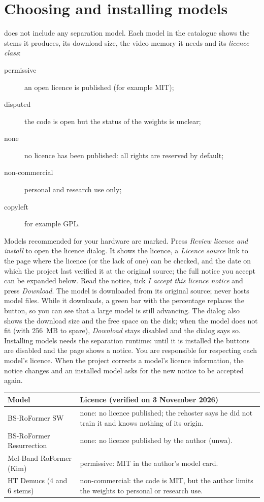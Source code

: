 \documentclass{covermaker}
\begin{document}
\chapter{Choosing and installing models}\label{ch:models}
\CM{} does not include any separation model. Each model in the catalogue shows
the stems it produces, its download size, the video memory it needs and its
\emph{licence class}:
\begin{description}
  \item[permissive] an open licence is published (for example MIT);
  \item[disputed] the code is open but the status of the weights is unclear;
  \item[none] no licence has been published: all rights are reserved by default;
  \item[non-commercial] personal and research use only;
  \item[copyleft] for example GPL.
\end{description}
Models recommended for your hardware are marked. Press \emph{Review licence and
install} to open the licence dialog. It shows the licence, a \emph{Licence
source} link to the page where the licence (or the lack of one) can be checked,
and the date on which the project last verified it at the original source;
the full notice you accept can be expanded below. Read the notice, tick \emph{I accept this licence notice} and press
\emph{Download}. The model is downloaded from its original source; \CM{} never
hosts model files. While it downloads, a green bar with the percentage replaces
the button, so you can see that a large model is still advancing. The dialog
also shows the download size and the free space on the disk; when the model
does not fit (with 256~MB to spare), \emph{Download} stays disabled and the
dialog says so. Installing
models needs the separation runtime: until it is installed the buttons are
disabled and the page shows a notice. You are responsible for respecting each model's licence.
When the project corrects a model's licence information, the notice changes and
an installed model asks for the new notice to be accepted again.

\begin{tabularx}{\linewidth}{@{}lY@{}}
\toprule
\textbf{Model} & \textbf{Licence (verified on 3 November 2026)} \\
\midrule
BS-RoFormer SW & none: no licence published; the rehoster says he did not train it and knows nothing of its origin. \\
BS-RoFormer Resurrection & none: no licence published by the author (unwa). \\
Mel-Band RoFormer (Kim) & permissive: MIT in the author's model card. \\
HT Demucs (4 and 6 stems) & non-commercial: the code is MIT, but the author limits the weights to personal or research use. \\
\bottomrule
\end{tabularx}
\end{document}
